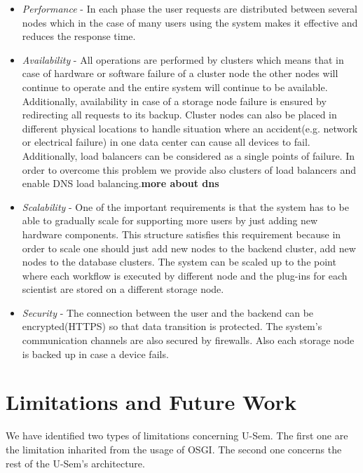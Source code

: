 \begin{itemize}

\item \textit{Performance} - In each phase the user requests are distributed between several nodes which in the case of many users using the system makes it effective and reduces the response time.

\item \textit{Availability} - All operations are performed by clusters which means that in case of hardware or software failure of a cluster node the other nodes will continue to operate and the entire system will continue to be available. Additionally, availability in case of a storage node failure is ensured by redirecting all requests to its backup. Cluster nodes can also be placed in different physical locations to handle situation where an accident(e.g. network or electrical failure) in one data center can cause all devices to fail. Additionally, load balancers can be considered as a single points of failure. In order to overcome this problem we provide also clusters of load balancers and enable DNS load balancing.\textbf{more about dns}

\item \textit{Scalability} - One of the important requirements is that the system has to be able to gradually scale for supporting more users  by just adding new hardware components. This structure satisfies this requirement because in order to scale one should just add new nodes to the backend cluster, add new nodes to the database clusters. The system can be scaled up to the point where each workflow is executed by different node and the plug-ins for each scientist are stored on a different storage node.

\item \textit{Security} - The connection between the user and the backend can be encrypted(HTTPS) so that data transition is protected. The system's communication channels are also secured by firewalls. Also each storage node is backed up in case a device fails.

\end{itemize}


\section{Limitations and Future Work}
\label{sec:limits}

We have identified two types of limitations concerning U-Sem. The first one are the limitation inharited from the usage of OSGI. The second one concerns the rest of the U-Sem's architecture.

